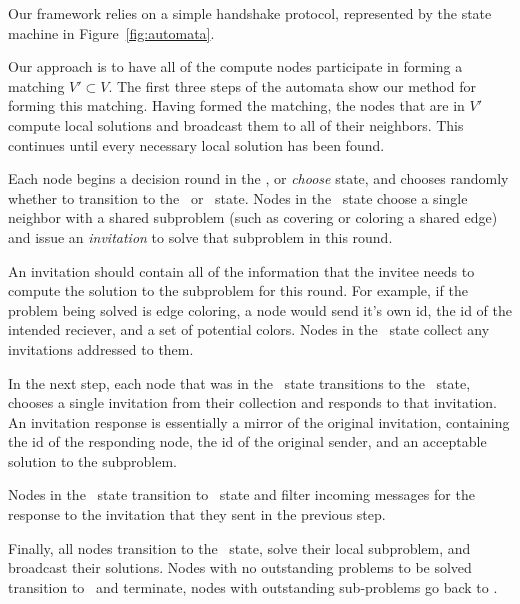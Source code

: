 \label{sec:automata}
Our framework relies on a simple handshake protocol, represented by the state machine in Figure~\ref{fig:automata}.

Our approach is to have all of the compute nodes participate in forming a matching $V' \subset V$. The first three steps of the automata show our method for forming this matching. Having formed the matching, the nodes that are in $V'$ compute local solutions and broadcast them to all of their neighbors. This continues until every necessary local solution has been found. 


Each node begins a decision round in the \cCd, or {\em choose} state, and chooses randomly whether to transition to the \cId\ or \cLd\ state. Nodes in the \cId\ state choose a single neighbor with a shared subproblem (such as covering or coloring a shared edge) and issue an {\em invitation} to solve that subproblem in this round. 

An invitation should contain all of the information that the invitee needs to compute the solution to the subproblem for this round. For example, if the problem being solved is edge coloring, a node would send it's own id, the id of the intended reciever, and a set of potential colors. Nodes in the \cLd\ state collect any invitations addressed to them. 

In the next step, each node that was in the \cLd\ state transitions to the \cRd\ state, chooses a single invitation from their collection and responds to that invitation. An invitation response is essentially a mirror of the original invitation, containing the id of the responding node, the id of the original sender, and an acceptable solution to the subproblem. 

Nodes in the \cId\ state transition to \cWd\ state and filter incoming messages for the response to the invitation that they sent in the previous step. 

Finally, all nodes transition to the \cUd\ state, solve their local subproblem, and broadcast their solutions. Nodes with no outstanding problems to be solved transition to \cDd\ and terminate, nodes with outstanding sub-problems go back to \cCd.
